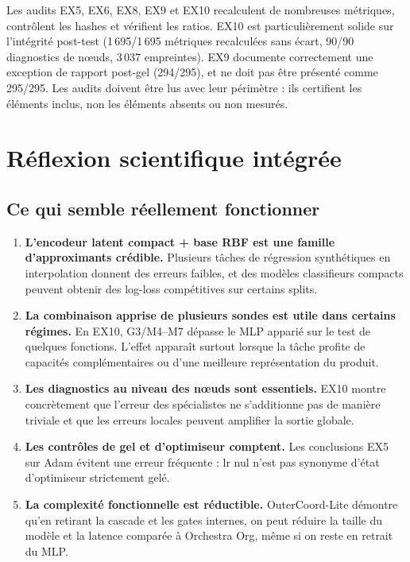 \documentclass[11pt,a4paper]{article}
\begin{document}
Les audits EX5, EX6, EX8, EX9 et EX10 recalculent de nombreuses métriques, contrôlent les hashes et vérifient les ratios. EX10 est particulièrement solide sur l'intégrité post-test (1\,695/1\,695 métriques recalculées sans écart, 90/90 diagnostics de nœuds, 3\,037 empreintes). EX9 documente correctement une exception de rapport post-gel (294/295), et ne doit pas être présenté comme 295/295. Les audits doivent être lus avec leur périmètre : ils certifient les éléments inclus, non les éléments absents ou non mesurés.

\section{Réflexion scientifique intégrée}

\subsection{Ce qui semble réellement fonctionner}

\begin{enumerate}
  \item \textbf{L'encodeur latent compact + base RBF est une famille d'approximants crédible.} Plusieurs tâches de régression synthétiques en interpolation donnent des erreurs faibles, et des modèles classifieurs compacts peuvent obtenir des log-loss compétitives sur certains splits.
  \item \textbf{La combinaison apprise de plusieurs sondes est utile dans certains régimes.} En EX10, G3/M4--M7 dépasse le MLP apparié sur le test de quelques fonctions. L'effet apparaît surtout lorsque la tâche profite de capacités complémentaires ou d'une meilleure représentation du produit.
  \item \textbf{Les diagnostics au niveau des nœuds sont essentiels.} EX10 montre concrètement que l'erreur des spécialistes ne s'additionne pas de manière triviale et que les erreurs locales peuvent amplifier la sortie globale.
  \item \textbf{Les contrôles de gel et d'optimiseur comptent.} Les conclusions EX5 sur Adam évitent une erreur fréquente : lr nul n'est pas synonyme d'état d'optimiseur strictement gelé.
  \item \textbf{La complexité fonctionnelle est réductible.} OuterCoord-Lite démontre qu'en retirant la cascade et les gates internes, on peut réduire la taille du modèle et la latence comparée à Orchestra Org, même si on reste en retrait du MLP.
\end{enumerate}
\end{document}
